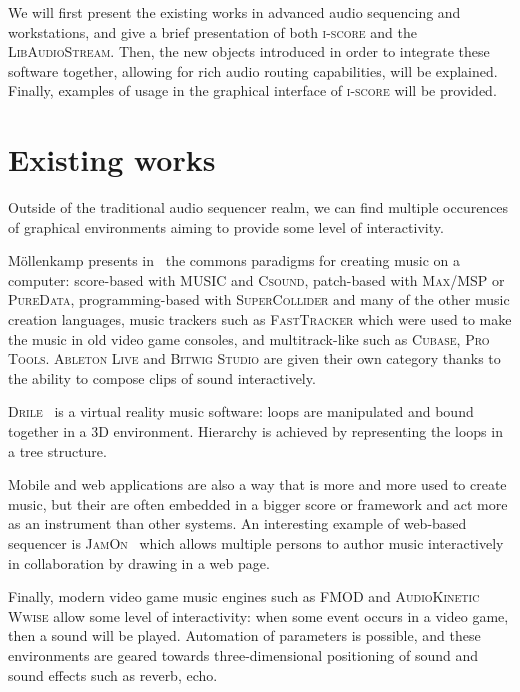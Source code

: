 \documentclass{article}
\newcommand*{\LibAudioStream}{\textsc{LibAudioStream}\xspace}
\newcommand*{\iscore}{\textsc{i-score}\xspace}
\newcommand*{\maxmsp}{\textsc{Max/MSP}\xspace}
\newcommand*{\puredata}{\textsc{PureData}\xspace}
\newcommand*{\csound}{\textsc{Csound}\xspace}
\newcommand*{\supercollider}{\textsc{SuperCollider}\xspace}
\newcommand*{\abletonlive}{\textsc{Ableton Live}\xspace}
\newcommand*{\bitwigstudio}{\textsc{Bitwig Studio}\xspace}
\newcommand*{\fasttracker}{\textsc{FastTracker}\xspace}
\newcommand*{\cubase}{\textsc{Cubase}\xspace}
\newcommand*{\protools}{\textsc{Pro Tools}\xspace}
\newcommand*{\MUSIC}{\textsc{MUSIC}\xspace}
\newcommand*{\drile}{\textsc{Drile}\xspace}
\newcommand*{\jamon}{\textsc{JamOn}\xspace}
\newcommand*{\wwise}{\textsc{AudioKinetic Wwise}\xspace}
\newcommand*{\fmod}{\textsc{FMOD}\xspace}
\begin{document}
We will first present the existing works in advanced audio sequencing and workstations, 
and give a brief presentation of both \iscore and the \LibAudioStream.
Then, the new objects introduced in order to integrate these software together, allowing 
for rich audio routing capabilities, will be explained.
Finally, examples of usage in the graphical interface of \iscore will be provided.



\section{Existing works}
Outside of the traditional audio sequencer realm, we can find 
multiple occurences of graphical environments aiming to provide 
some level of interactivity.

M{\"o}llenkamp presents in~\cite{mollenkampparadigms} the 
commons paradigms for creating music on a computer: score-based with \MUSIC and \csound, 
patch-based with \maxmsp or \puredata, programming-based with \supercollider and many of the other music creation languages, music trackers such as \fasttracker which were used to make the music in old video game consoles, and multitrack-like such as \cubase, \protools.
\abletonlive and \bitwigstudio are given their own category thanks to the ability to compose clips of sound interactively.

\drile~\cite{berthaut2010drile} is a virtual reality music software: loops are manipulated and bound together in a 3D environment. Hierarchy is achieved by representing the loops in a tree structure.

Mobile and web applications are also a way that is more and more used to create music, 
but their are often embedded in a bigger score or framework and act more as an instrument than other systems.
An interesting example of web-based sequencer is \jamon~\cite{rosselet2013jam} which allows multiple persons to author music interactively in collaboration by drawing in a web page.

Finally, modern video game music engines such as \fmod and \wwise allow some level of interactivity: when some event occurs in a video game, then a sound will be played. 
Automation of parameters is possible, and these environments are geared towards three-dimensional positioning of sound and sound effects such as reverb, echo.
\end{document}
